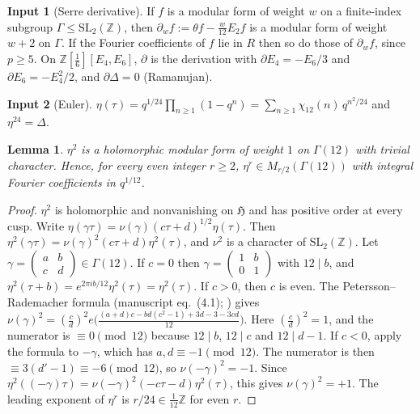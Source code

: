 \documentclass[11pt,a4paper]{article}
\numberwithin{equation}{section}
\newtheorem{lemma}[theorem]{Lemma}
\theoremstyle{definition}
\newtheorem{fact}{Input}
\theoremstyle{remark}
\newcommand{\Z}{\mathbb Z}
\newcommand{\leg}[2]{\left(\frac{#1}{#2}\right)}
\begin{document}
\begin{fact}[Serre derivative]\label{in:serre}
If $f$ is a modular form of weight $w$ on a finite-index subgroup $\Gamma\le\mathrm{SL}_2(\Z)$,
then $\partial_wf:=\theta f-\frac{w}{12}E_2f$ is a modular form of weight $w+2$ on $\Gamma$. If
the Fourier coefficients of $f$ lie in $R$ then so do those of $\partial_wf$, since $p\ge5$.
On $\Z[\frac16][E_4,E_6]$, $\partial$ is the derivation with $\partial E_4=-E_6/3$ and
$\partial E_6=-E_4^2/2$, and $\partial\Delta=0$ (Ramanujan).
\end{fact}

\begin{fact}[Euler]\label{in:euler}
$\eta(\tau)=q^{1/24}\prod_{n\ge1}(1-q^n)=\sum_{n\ge1}\chi_{12}(n)\,q^{n^2/24}$ and $\eta^{24}=\Delta$.
\end{fact}

\begin{lemma}\label{lem:eta2}
$\eta^2$ is a holomorphic modular form of weight $1$ on $\Gamma(12)$ with trivial character.
Hence, for every even integer $r\ge2$, $\eta^{r}\in M_{r/2}(\Gamma(12))$ with integral Fourier
coefficients in $q^{1/12}$.
\end{lemma}

\begin{proof}
$\eta^2$ is holomorphic and nonvanishing on $\mathfrak H$ and has positive order at every cusp.
Write $\eta(\gamma\tau)=\nu(\gamma)(c\tau+d)^{1/2}\eta(\tau)$. Then
$\eta^2(\gamma\tau)=\nu(\gamma)^2(c\tau+d)\eta^2(\tau)$, and $\nu^2$ is a character of
$\mathrm{SL}_2(\Z)$. Let $\gamma=\begin{pmatrix}a&b\\c&d\end{pmatrix}\in\Gamma(12)$. If $c=0$ then
$\gamma=\begin{pmatrix}1&b\\0&1\end{pmatrix}$ with $12\mid b$, and $\eta^2(\tau+b)=e^{2\pi ib/12}\eta^2(\tau)=\eta^2(\tau)$.
If $c>0$, then $c$ is even. The Petersson--Rademacher formula
(manuscript eq.~(4.1); \cite[Ch.~4]{Knopp70}) gives
$\nu(\gamma)^2=\leg{c}{d}^2e\bigl(\frac{(a+d)c-bd(c^2-1)+3d-3-3cd}{12}\bigr)$. Here
$\leg cd^2=1$, and the numerator is $\equiv0\pmod{12}$ because $12\mid b$, $12\mid c$ and
$12\mid d-1$. If $c<0$, apply the formula to $-\gamma$, which has $a,d\equiv-1\pmod{12}$. The
numerator is then $\equiv3(d'-1)\equiv-6\pmod{12}$, so $\nu(-\gamma)^2=-1$. Since
$\eta^2((-\gamma)\tau)=\nu(-\gamma)^2(-c\tau-d)\eta^2(\tau)$, this gives $\nu(\gamma)^2=+1$.
The leading exponent of $\eta^r$ is $r/24\in\frac1{12}\Z$ for even $r$.
\end{proof}
\end{document}
